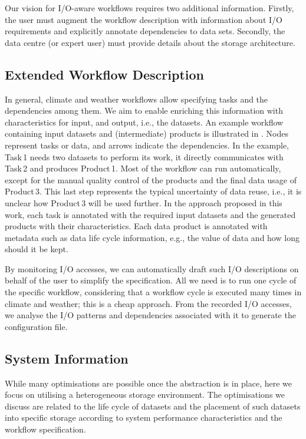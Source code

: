 \documentclass{superfri}
\begin{document}
Our vision for I/O-aware workflows requires two additional information. Firstly, the user must augment the workflow description with information about I/O requirements and explicitly annotate dependencies to data sets. Secondly, the data centre (or expert user) must provide details about the storage architecture.

\subsection{Extended Workflow Description}

In general, climate and weather workflows allow specifying tasks and the dependencies among them.
We aim to enable enriching this information with characteristics for input, and output, i.e., the datasets.
An example workflow containing input datasets and (intermediate) products is illustrated in .
Nodes represent tasks or data, and arrows indicate the dependencies.
In the example, Task\,1 needs two datasets to perform its work, it directly communicates with Task\,2 and produces Product\,1.
Most of the workflow can run automatically, except for the manual quality control of the products and the final data usage of Product\,3.
This last step represents the typical uncertainty of data reuse, i.e., it is unclear how Product\,3 will be used further.
In the approach proposed in this work, each task is annotated with the required input datasets and the generated products with their characteristics.
Each data product is annotated with metadata such as data life cycle information, e.g., the value of data and how long should it be kept.

By monitoring I/O accesses, we can automatically draft such I/O descriptions on behalf of the user to simplify the specification.
All we need is to run one cycle of the specific workflow, considering that a workflow cycle is executed many times in climate and weather; this is a cheap approach.
From the recorded I/O accesses, we analyse the I/O patterns and dependencies associated with it to generate the configuration file.


\subsection{System Information}

While many optimisations are possible once the abstraction is in place, here we focus on utilising a heterogeneous storage environment. The optimisations we discuss are related to the life cycle of datasets and the placement of such datasets into specific storage according to system performance characteristics and the workflow specification.
\end{document}
